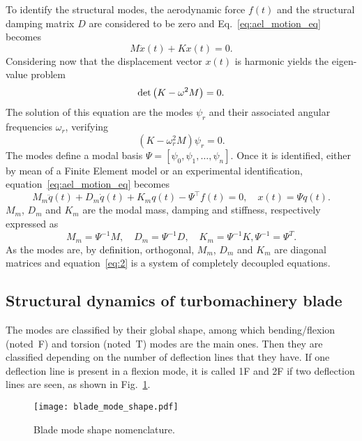 To identify the structural modes, the aerodynamic force $f(t)$ and
the structural damping matrix $D$ are considered to be zero
and Eq.~\eqref{eq:ael_motion_eq} becomes
\begin{equation}
	M \ddot{x}(t) + K x(t) = 0.
	\label{eq:ael_motion_eq_free_response}
\end{equation}
Considering now that the displacement vector $x(t)$ is harmonic
yields the eigen-value problem
\begin{equation}
	\mdet \left(K - \omega^2 M  \right) = 0.
	\label{eq:ael_motion_eq_eigen_value}
\end{equation}
The solution of this equation are the modes $\psi_r$
and their associated angular frequencies $\omega_r$, verifying
\begin{equation}
	\left(K - \omega_r^2 M  \right) \psi_r = 0.
\end{equation}
The modes define a modal basis 
$\Psi = [\psi_0, \psi_1, \dots, \psi_n]$.
Once it
is identified, either by mean of a Finite
Element model or an experimental identification, 
equation~\ref{eq:ael_motion_eq} becomes
\begin{equation}
  \label{eq:2}
  M_m \ddot{q}(t) + D_m \dot{q}(t) + K_m q (t) - \Psi^\top f(t)=0, \quad x(t) = \Psi q(t).
\end{equation}
$M_m$, $D_m$ and $K_m$ are the modal mass, 
damping and stiffness, respectively expressed as
\begin{equation}
    M_m = \Psi ^{-1} M, \quad D_m = \Psi ^{-1} D, \quad K_m = \Psi ^{-1} K, \Psi ^{-1}  = \Psi ^{T}.
\end{equation}
As the modes are, by definition, orthogonal,
$M_m$, $D_m$ and $K_m$ are diagonal matrices and
equation~\eqref{eq:2} is a system of completely decoupled equations.

\subsection{Structural dynamics of turbomachinery blade}
\label{sub:structural_dynamics_of_turbomachinery_blade}

The modes are classified by their global shape, among which 
bending/flexion (noted~F) and torsion (noted~T) 
modes are the main ones. Then they are classified
depending on the number of deflection lines that they
have. If one deflection line is present in a flexion 
mode, it is called 1F and 2F if two deflection lines are
seen, as shown in Fig.~\ref{fig:blade_mode_shape}.
\begin{figure}[htp]
  \centering
  \texttt{[image: blade\_mode\_shape.pdf]}
  \caption{Blade mode shape nomenclature.}
  \label{fig:blade_mode_shape}
\end{figure}

